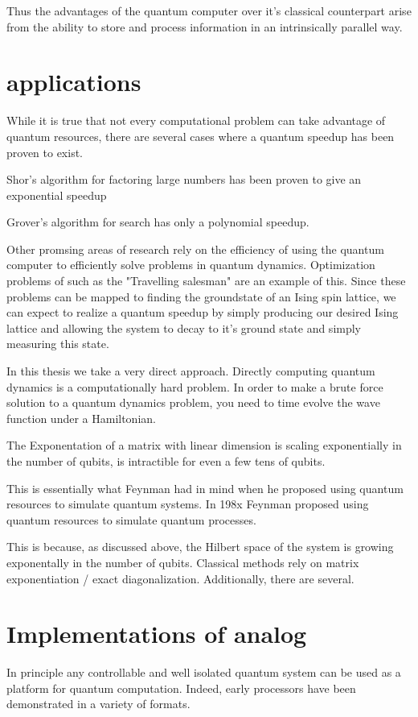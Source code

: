 Thus the advantages of the quantum computer over it's classical counterpart arise from the ability to store and process information in an intrinsically parallel way.
\section{applications}
While it is true that not every computational problem can take advantage of quantum resources, there are several cases where a quantum speedup has been proven to exist.

Shor's algorithm for factoring large numbers has been proven to give an exponential speedup

Grover's algorithm for search has only a polynomial speedup.

Other promsing areas of research rely on the efficiency of using the quantum computer to efficiently solve problems in quantum dynamics.
Optimization problems of such as the "Travelling salesman" are an example of this.  Since these problems can be mapped to finding the groundstate of an Ising spin lattice,
we can expect to realize a quantum speedup by simply producing our desired Ising lattice and allowing the system to decay to it's ground state and simply measuring this state.

In this thesis we take a very direct approach.
Directly computing quantum dynamics is a computationally hard problem.
In order to make a brute force solution to a quantum dynamics problem, you need to time evolve the wave function under a Hamiltonian.

The Exponentation of a matrix with linear dimension is scaling exponentially in the number of qubits, is intractible for even a few tens of qubits.

This is essentially what Feynman had in mind when he proposed using quantum resources to simulate quantum systems.
In 198x Feynman proposed using quantum resources to simulate quantum processes.

This is because, as discussed above, the Hilbert space of the system is growing exponentally in the number of qubits.
Classical methods rely on matrix exponentiation / exact diagonalization.
Additionally, there are several.

\section{Implementations of analog}
In principle any controllable and well isolated quantum system can be used as a platform for quantum computation.
Indeed, early processors have been demonstrated in a variety of formats.

